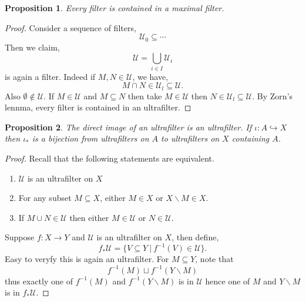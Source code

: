 \documentclass[10pt]{article}
\numberwithin{equation}{section}
\newtheorem{proposition}{Proposition}[section]
\newcommand{\sep}[0]{\:|\:}
\begin{document}
 \begin{proposition}
  Every filter is contained in a maximal filter.
 \end{proposition}
 \begin{proof}
  Consider a sequence of filters, 
  \begin{equation*}
    \mathcal{U}_0\subseteq\cdots
  \end{equation*}
  Then we claim,
  \begin{equation*}
    \mathcal{U} = \bigcup_{i\in I}\mathcal{U}_i
  \end{equation*}
  is again a filter. Indeed if $M,N\in\mathcal{U}$, we have,
  \begin{equation*}
    M\cap N\in\mathcal{U}_l\subseteq\mathcal{U}.
  \end{equation*}
  Also $\emptyset\not\in\mathcal{U}$.  If $M\in\mathcal{U}$ and $M\subseteq N$ then take $M\in\mathcal{U}$ then $N\in\mathcal{U}_l\subseteq \mathcal{U}$. By Zorn's lennma, every filter is contained in an ultrafilter.
 \end{proof}
 \begin{proposition}
  The direct image of an ultrafilter is an ultrafilter. If $\iota:A\hookrightarrow X$ then $\iota_*$ is a bijection from ultrafilters on $A$ to ultrafilters on $X$ containing $A$.
 \end{proposition}
 \begin{proof}
  Recall that the following statements are equivalent.
  \begin{enumerate}
    \item $\mathcal{U}$ is an ultrafilter on $X$
    \item For any subset $M\subseteq X$, either $M\in X$ or $X\backslash M\in X$. 
    \item If $M\cup N\in\mathcal{U}$ then either $M\in\mathcal{U}$ or $N\in\mathcal{U}$. 
  \end{enumerate}
  Suppose $f:X\to Y$ and $\mathcal{U}$ is an ultrafilter on $X$, then define,
  \begin{equation*}
    f_*\mathcal{U} = \{V\subseteq Y\sep f^{-1}(V)\in\mathcal{U}\}.
  \end{equation*}
  Easy to veryfy this is again an ultrafilter. For $M\subseteq Y$, note that 
  \begin{equation*}
    f^{-1}(M)\sqcup f^{-1}(Y\backslash M)
  \end{equation*}
  thus exactly one of $f^{-1}(M)$ and $f^{-1}(Y\backslash M)$ is in $\mathcal{U}$ hence one of $M$ and $Y\backslash M$ is in $f_*\mathcal{U}$. 
 \end{proof}
\end{document}
